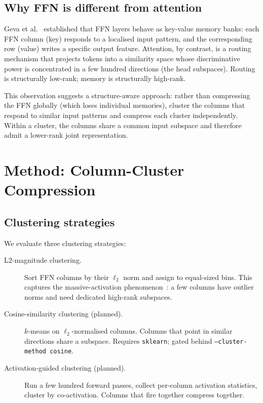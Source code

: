 \documentclass[11pt]{article}
\begin{document}
\subsection{Why FFN is different from attention}

Geva et al.~\cite{geva2021ffn} established that FFN layers behave as
key-value memory banks: each FFN column (key) responds to a localised
input pattern, and the corresponding row (value) writes a specific
output feature.  Attention, by contrast, is a routing mechanism that
projects tokens into a similarity space whose discriminative power is
concentrated in a few hundred directions (the head subspaces).  Routing
is structurally low-rank; memory is structurally high-rank.

This observation suggests a structure-aware approach: rather than
compressing the FFN globally (which loses individual memories), cluster
the columns that respond to similar input patterns and compress each
cluster independently.  Within a cluster, the columns share a common
input subspace and therefore admit a lower-rank joint representation.

\section{Method: Column-Cluster Compression}
\label{sec:method}

\subsection{Clustering strategies}

We evaluate three clustering strategies:

\begin{description}
\item[L2-magnitude clustering.]  Sort FFN columns by their $\ell_2$ norm
      and assign to equal-sized bins.  This captures the massive-activation
      phenomenon~\cite{sun2024massive}: a few columns have outlier norms
      and need dedicated high-rank subspaces.

\item[Cosine-similarity clustering (planned).]  $k$-means on $\ell_2$-normalised
      columns.  Columns that point in similar directions share a subspace.
      Requires \texttt{sklearn}; gated behind \texttt{--cluster-method cosine}.

\item[Activation-guided clustering (planned).]  Run a few hundred forward
      passes, collect per-column activation statistics, cluster by
      co-activation.  Columns that fire together compress together.
\end{description}
\end{document}
